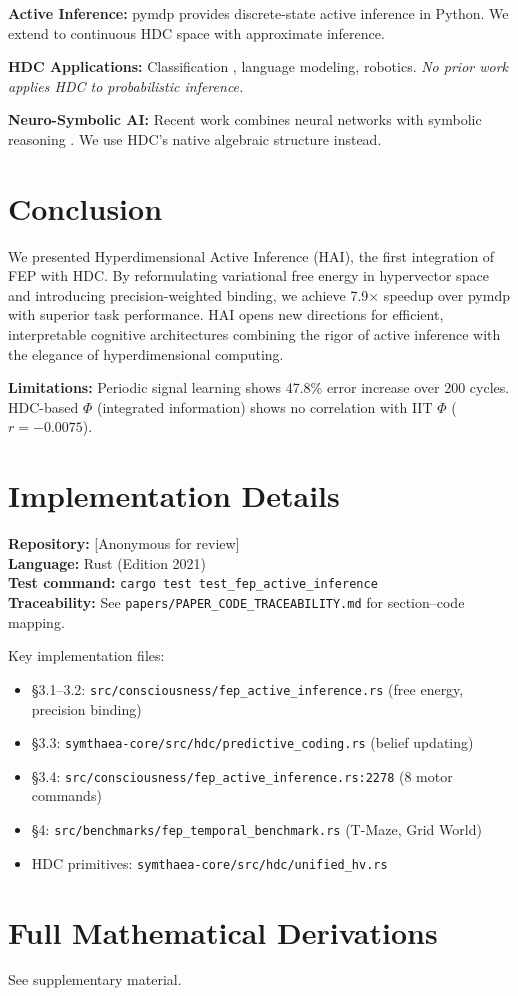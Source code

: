 \documentclass{article}
\begin{document}
\textbf{Active Inference:} pymdp \citep{heins2022pymdp} provides discrete-state active inference in Python. We extend to continuous HDC space with approximate inference.

\textbf{HDC Applications:} Classification \citep{rahimi2016robust}, language modeling, robotics. \emph{No prior work applies HDC to probabilistic inference.}

\textbf{Neuro-Symbolic AI:} Recent work combines neural networks with symbolic reasoning \citep{garcez2020neurosymbolic}. We use HDC's native algebraic structure instead.

\section{Conclusion}

We presented Hyperdimensional Active Inference (HAI), the first integration of FEP with HDC. By reformulating variational free energy in hypervector space and introducing precision-weighted binding, we achieve 7.9$\times$ speedup over pymdp with superior task performance. HAI opens new directions for efficient, interpretable cognitive architectures combining the rigor of active inference with the elegance of hyperdimensional computing.

\textbf{Limitations:} Periodic signal learning shows 47.8\% error increase over 200 cycles. HDC-based $\Phi$ (integrated information) shows no correlation with IIT $\Phi$ ($r = -0.0075$).




\appendix

\section{Implementation Details}

\textbf{Repository:} [Anonymous for review] \\
\textbf{Language:} Rust (Edition 2021) \\
\textbf{Test command:} \texttt{cargo test test\_fep\_active\_inference} \\
\textbf{Traceability:} See \texttt{papers/PAPER\_CODE\_TRACEABILITY.md} for section--code mapping.

Key implementation files:
\begin{itemize}
    \item \S3.1--3.2: \texttt{src/consciousness/fep\_active\_inference.rs} (free energy, precision binding)
    \item \S3.3: \texttt{symthaea-core/src/hdc/predictive\_coding.rs} (belief updating)
    \item \S3.4: \texttt{src/consciousness/fep\_active\_inference.rs:2278} (8 motor commands)
    \item \S4: \texttt{src/benchmarks/fep\_temporal\_benchmark.rs} (T-Maze, Grid World)
    \item HDC primitives: \texttt{symthaea-core/src/hdc/unified\_hv.rs}
\end{itemize}

\section{Full Mathematical Derivations}

See supplementary material.
\end{document}
